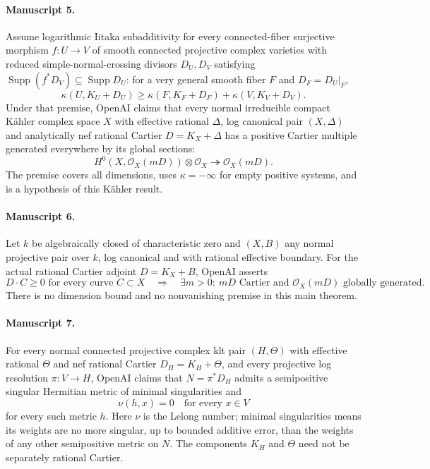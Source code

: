 \documentclass[11pt]{article}
\begin{document}
\paragraph{Manuscript 5.}
Assume logarithmic Iitaka subadditivity for every connected-fiber surjective morphism $f:U\to V$ of smooth connected projective complex varieties with reduced simple-normal-crossing divisors $D_U,D_V$ satisfying $\operatorname{Supp}(f^*D_V)\subseteq\operatorname{Supp}D_U$: for a very general smooth fiber $F$ and $D_F=D_U|_F$,
\[
\kappa(U,K_U+D_U)\ge\kappa(F,K_F+D_F)+\kappa(V,K_V+D_V).
\]
Under that premise, OpenAI claims that every normal irreducible compact Kähler complex space $X$ with effective rational $\Delta$, log canonical pair $(X,\Delta)$ and analytically nef rational Cartier $D=K_X+\Delta$ has a positive Cartier multiple generated everywhere by its global sections:
\[
H^0(X,\mathcal O_X(mD))\otimes\mathcal O_X\twoheadrightarrow\mathcal O_X(mD).
\]
The premise covers all dimensions, uses $\kappa=-\infty$ for empty positive systems, and is a hypothesis of this Kähler result.

\paragraph{Manuscript 6.}
Let $k$ be algebraically closed of characteristic zero and $(X,B)$ any normal projective pair over $k$, log canonical and with rational effective boundary. For the actual rational Cartier adjoint $D=K_X+B$, OpenAI asserts
\[
D\cdot C\ge0\text{ for every curve }C\subset X
\quad\Longrightarrow\quad
\exists m>0:\ mD\text{ Cartier and }\mathcal O_X(mD)\text{ globally generated}.
\]
There is no dimension bound and no nonvanishing premise in this main theorem.

\paragraph{Manuscript 7.}
For every normal connected projective complex klt pair $(H,\Theta)$ with effective rational $\Theta$ and nef rational Cartier $D_H=K_H+\Theta$, and every projective log resolution $\pi:V\to H$, OpenAI claims that $N=\pi^*D_H$ admits a semipositive singular Hermitian metric of minimal singularities and
\[
\nu(h,x)=0\quad\text{for every }x\in V
\]
for every such metric $h$. Here $\nu$ is the Lelong number; minimal singularities means its weights are no more singular, up to bounded additive error, than the weights of any other semipositive metric on $N$. The components $K_H$ and $\Theta$ need not be separately rational Cartier.
\end{document}
